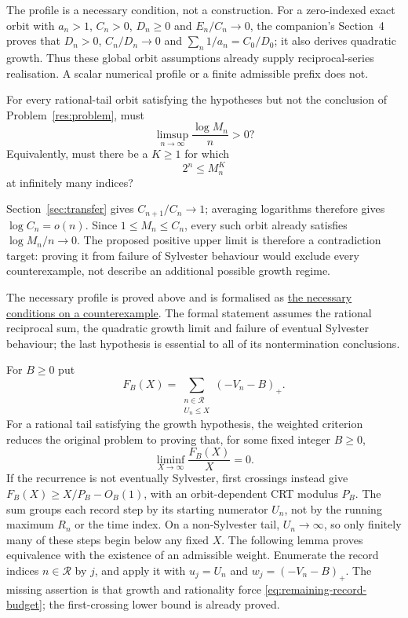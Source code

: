 \documentclass[11pt]{article}
\begin{document}
The profile is a necessary condition, not a construction. For a zero-indexed exact orbit
with $a_n>1$, $C_n>0$, $D_n\ge0$ and $E_n/C_n\to0$, the companion's
Section~4 proves that $D_n>0$, $C_n/D_n\to0$ and
$\sum_n1/a_n=C_0/D_0$; it also derives quadratic growth. Thus these
global orbit assumptions already supply reciprocal-series realisation.
A scalar numerical profile or a finite admissible prefix does not.

\begin{problem}\label{res:lcmheight}
For every rational-tail orbit satisfying the hypotheses but not the conclusion of Problem~\ref{res:problem},
must
\[
 \limsup_{n\to\infty}\frac{\log M_n}{n}>0?
\]
Equivalently, must there be a $K\ge1$ for which
\[
 2^n\le M_n^K
\]
at infinitely many indices?
\end{problem}
Section~\ref{sec:transfer} gives $C_{n+1}/C_n\to1$; averaging logarithms
therefore gives $\log C_n=o(n)$. Since $1\le M_n\le C_n$, every such
orbit already satisfies $\log M_n/n\to0$. The proposed positive upper limit
is therefore a contradiction target: proving it from failure of
Sylvester behaviour would exclude every counterexample, not describe
an additional possible growth regime.

The necessary profile is proved above and is formalised as
\href{https://github.com/wcook04/plectis-erdos/blob/3d6d938d696fed0fb71dd55115a18a73738ff223/lean/ErdosProblems/Erdos243/PaperCompleteR7/Frontier.lean\#L151}{the necessary conditions on a counterexample}. The formal statement assumes the rational reciprocal sum, the
quadratic growth limit and failure of eventual Sylvester behaviour; the
last hypothesis is essential to all of its nontermination conclusions.

For $B\ge0$ put
\[
 F_B(X)=\sum_{\substack{n\in\mathcal R\\U_n\le X}}(-V_n-B)_+.
\]
For a rational tail satisfying the growth hypothesis, the weighted
criterion reduces the original problem to proving that, for some fixed
integer $B\ge0$,
\begin{equation}\label{eq:remaining-record-budget}
 \liminf_{X\to\infty}\frac{F_B(X)}X=0.
\end{equation}
If the recurrence is not eventually Sylvester, first crossings instead give
$F_B(X)\ge X/P_B-O_B(1)$, with an orbit-dependent CRT modulus $P_B$.
The sum groups each record step by its starting numerator $U_n$, not by
the running maximum $R_n$ or the time index. On a non-Sylvester tail,
$U_n\to\infty$, so only finitely many of these steps begin below any
fixed $X$.
The following lemma proves equivalence with the existence of an admissible
weight. Enumerate the record indices $n\in\mathcal R$ by $j$, and apply it
with $u_j=U_n$ and $w_j=(-V_n-B)_+$. The missing assertion is that growth and rationality force
\eqref{eq:remaining-record-budget}; the first-crossing lower bound is
already proved.
\end{document}

